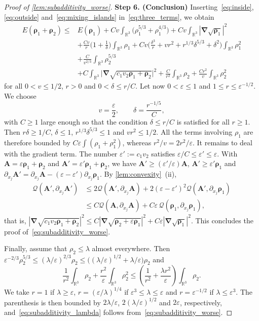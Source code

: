 \documentclass[final,reqno]{amsart}
\theoremstyle{remark}
\renewcommand{\le}{\leqslant}
\renewcommand{\ge}{\geqslant}
\renewcommand{\epsilon}{\varepsilon}
\newcommand{\RR}{\mathbb{R}}
\newcommand{\grad}{\bm{\nabla}}
\newcommand{\QC}{\mathcal{Q}}
\begin{document}
\begin{proof}[Proof of \cref{lem:subadditivity_worse}]
\medskip

\noindent\textbf{Step 6. (Conclusion)} Inserting~\cref{eq:inside}, \cref{eq:outside} and~\cref{eq:mixing_islands} in~\cref{eq:three_terms}, we obtain
\begin{align}
E(\bm{\rho}_1+\bm{\rho}_2)\le& E(\bm{\rho}_1)+Cv\int_{\RR^3}\big(\rho_1^{5/3}+\rho_1^{4/3}\big)+Cv\int_{\RR^3}|\grad\sqrt{\bm{\rho}_1}|^2\nonumber\\
&+\frac{Cv}{r}\Big(1+\frac1\delta\Big)\int_{\RR^3}\rho_1+Cv\Big(\frac{\delta^3}{r}+vr^2+r^{1/3}\delta^{5/3}+\delta^2\Big)\int_{\RR^3}\rho_1^2\nonumber\\
&+\frac{C}{v^{2/3}}\int_{\RR^3}\rho_2^{5/3}\nonumber\\
&+C\int_{\RR^3}\big|\grad\sqrt{c_1v_2\bm{\rho}_1+\bm{\rho}_2}\big|^2+\frac{C}{r^2}\int_{\RR^3}\rho_2+\frac{Cr^2}{v}\int_{\RR^3}\rho_2^2
\label{eq:subadditivity_general}
\end{align}
for all $0<v\le1/2$, $r>0$ and $0<\delta\le r/C$. Let now $0<\epsilon\le1$ and $1\le r\le\epsilon^{-1/2}$. We choose
$$
v=\frac\epsilon2,\qquad\delta=\frac{r^{-1/5}}{C},
$$
with $C\ge1$ large enough so that the condition $\delta\le r/C$ is satisfied for all $r\ge1$. Then $r\delta\ge1/C$, $\delta\le1$, $r^{1/3}\delta^{5/3}\le1$ and $vr^2\le1/2$. All the terms involving $\rho_1$ are therefore bounded by $C\epsilon\int(\rho_1+\rho_1^2)$, whereas $r^2/v=2r^2/\epsilon$. It remains to deal with the gradient term. The number $\epsilon':=c_1v_2$ satisfies $\epsilon/C\le\epsilon'\le\epsilon$. With $\mathbf{A}=\epsilon \bm{\rho}_1+\bm{\rho}_2$ and $\mathbf{A}'=\epsilon'\bm{\rho}_1+\bm{\rho}_2$, we have $\mathbf{A}'\ge(\epsilon'/\epsilon)\mathbf{A}$, $\mathbf{A}'\ge\epsilon'\bm{\rho}_1$ and $\partial_{x_j}\mathbf{A}'=\partial_{x_j}\mathbf{A}-(\epsilon-\epsilon')\partial_{x_j}\bm{\rho}_1$. By \cref{lem:convexity}~(ii),
\begin{align*}
\QC(\mathbf{A}',\partial_{x_j}\mathbf{A}')&\le2\QC(\mathbf{A}',\partial_{x_j}\mathbf{A})+2(\epsilon-\epsilon')^2\QC(\mathbf{A}',\partial_{x_j}\bm{\rho}_1)\\
&\le C\QC(\mathbf{A},\partial_{x_j}\mathbf{A})+C\epsilon\,\QC(\bm{\rho}_1,\partial_{x_j}\bm{\rho}_1),
\end{align*}
that is, $|\grad\sqrt{c_1v_2\bm{\rho}_1+\bm{\rho}_2}|^2\le C|\grad\sqrt{\bm{\rho}_2+\epsilon \bm{\rho}_1}|^2+C\epsilon|\grad\sqrt{\bm{\rho}_1}|^2$. This concludes the proof of~\cref{eq:subadditivity_worse}.

Finally, assume that $\rho_2\le\lambda$ almost everywhere. Then $\epsilon^{-2/3}\rho_2^{5/3}\le(\lambda/\epsilon)^{2/3}\rho_2\le\big((\lambda/\epsilon)^{1/2}+\lambda/\epsilon\big)\rho_2$ and
$$
\frac{1}{r^2}\int_{\RR^3}\rho_2+\frac{r^2}{\epsilon}\int_{\RR^3}\rho_2^2\le\left(\frac{1}{r^2}+\frac{\lambda r^2}{\epsilon}\right)\int_{\RR^3}\rho_2.
$$
We take $r=1$ if $\lambda\ge\epsilon$, $r=(\epsilon/\lambda)^{1/4}$ if $\epsilon^3\le\lambda\le\epsilon$ and $r=\epsilon^{-1/2}$ if $\lambda\le\epsilon^3$. The parenthesis is then bounded by $2\lambda/\epsilon$, $2(\lambda/\epsilon)^{1/2}$ and $2\epsilon$, respectively, and~\cref{eq:subadditivity_lambda} follows from~\cref{eq:subadditivity_worse}.
\end{proof}
\end{document}
